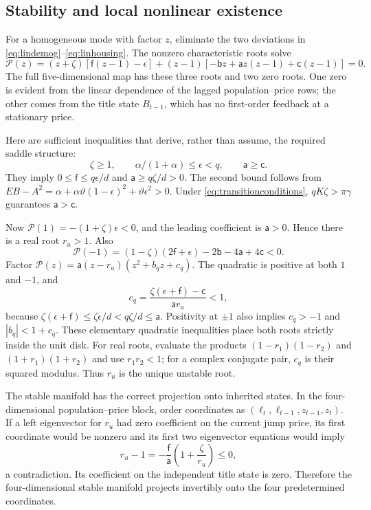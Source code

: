 \documentclass[11pt]{article}
\newcommand{\tht}{\vartheta}
\begin{document}
\subsection{Stability and local nonlinear existence}
For a homogeneous mode with factor $z$, eliminate the two deviations in \eqref{eq:lindemog}--\eqref{eq:linhousing}. The nonzero characteristic roots solve
\begin{equation}
 \mathcal P(z)=(z+\zeta)[\mathsf f(z-1)-\epsilon]
 +(z-1)[-\mathsf b z+\mathsf a z(z-1)+\mathsf c(z-1)]=0.\label{eq:characteristic}
\end{equation}
The full five-dimensional map has these three roots and two zero roots. One zero is evident from the linear dependence of the lagged population--price rows; the other comes from the title state $B_{t-1}$, which has no first-order feedback at a stationary price.

Here are sufficient inequalities that derive, rather than assume, the required saddle structure:
\begin{equation}
 \zeta\ge1,\qquad \alpha/(1+\alpha)\le\epsilon<q,
 \qquad \mathsf a\ge\mathsf c.\label{eq:stabilitysimple}
\end{equation}
They imply $0\le\mathsf f\le q\epsilon/d$ and $\mathsf a\ge q\zeta/d>0$. The second bound follows from
$EB-A^2=\alpha+\alpha\tht(1-\epsilon)^2+\tht\epsilon^2>0$.
Under \eqref{eq:transitionconditions}, $qK\zeta>\pi\gamma$ guarantees $\mathsf a>\mathsf c$.

Now $\mathcal P(1)=-(1+\zeta)\epsilon<0$, and the leading coefficient is $\mathsf a>0$. Hence there is a real root $r_u>1$. Also
\[
 \mathcal P(-1)=(1-\zeta)(2\mathsf f+\epsilon)
               -2\mathsf b-4\mathsf a+4\mathsf c<0.
\]
Factor $\mathcal P(z)=\mathsf a(z-r_u)(z^2+b_qz+c_q)$. The quadratic is positive at both $1$ and $-1$, and
\[
 c_q=\frac{\zeta(\epsilon+\mathsf f)-\mathsf c}{\mathsf a r_u}<1,
\]
because $\zeta(\epsilon+\mathsf f)\le\zeta\epsilon/d<q\zeta/d\le\mathsf a$.
Positivity at $\pm1$ also implies $c_q>-1$ and $|b_q|<1+c_q$. These elementary quadratic inequalities place both roots strictly inside the unit disk. For real roots, evaluate the products $(1-r_1)(1-r_2)$ and $(1+r_1)(1+r_2)$ and use $r_1r_2<1$; for a complex conjugate pair, $c_q$ is their squared modulus. Thus $r_u$ is the unique unstable root.

The stable manifold has the correct projection onto inherited states. In the four-dimensional population--price block, order coordinates as $(\ell_t,\ell_{t-1},z_{t-1},z_t)$. If a left eigenvector for $r_u$ had zero coefficient on the current jump price, its first coordinate would be nonzero and its first two eigenvector equations would imply
\[
 r_u-1=-\frac{\mathsf f}{\mathsf a}\left(1+\frac\zeta{r_u}\right)\le0,
\]
a contradiction. Its coefficient on the independent title state is zero. Therefore the four-dimensional stable manifold projects invertibly onto the four predetermined coordinates.
\end{document}
